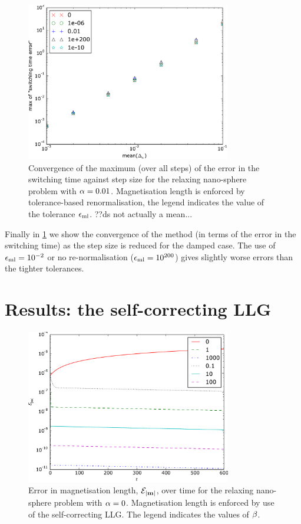 \begin{figure}
  \centering
  \includegraphics[width=0.8\textwidth]{plots/tolrenorm_llg_ode_convergence/maxofswitchingtimeerrorvsmeanofdts}
  \caption{
    Convergence of the maximum (over all steps) of the error in the switching time
    against step size
    for the relaxing nano-sphere problem with
    $\alpha = 0.01$.
    Magnetisation length is enforced by tolerance-based renormalisation,
    the legend indicates the value of the tolerance $\epsilon_{\mathrm{ml}}$.
    ??ds not actually a mean...
  }
  \label{fig:tol-renorm-convergence}
\end{figure}

Finally in \cref{fig:tol-renorm-convergence} we show the convergence of the method (in terms of the error in the switching time) as the step size is reduced for the damped case.
The use of $\epsilon_{\mathrm{ml}}=10^{-2}$ or no re-normalisation ($\epsilon_{\mathrm{ml}}=10^{200}$) gives slightly worse errors than the tighter tolerances.


\FloatBarrier
\section{Results: the self-correcting LLG}
\label{sec:self-correcting-llg-results}

\begin{figure}
  \centering
  \includegraphics[width=0.8\textwidth]{plots/sc-geom-properties/0-mlengtherrormaxesvstimes.pdf}
  \caption{
    Error in magnetisation length, $\mathcal{E}_{\left|{\boldsymbol{\mathrm{m}}} \right|}$, over time
    for the relaxing nano-sphere problem
    with $\alpha = 0$.
    Magnetisation length is enforced by use of the self-correcting LLG.
   The legend indicates the values of $\beta$.
  }
  \label{fig:sc-ml-err-undamped}
\end{figure}

